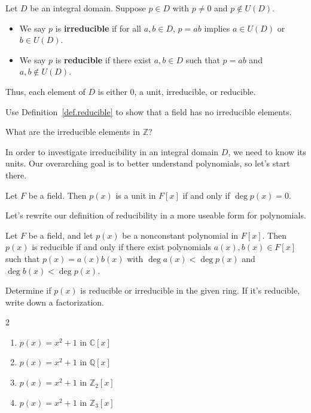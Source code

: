 \begin{definition}\label{def.reducible}
Let $D$ be an integral domain. Suppose $p\in D$ with $p\neq 0$ and $p\notin U(D)$. 
\begin{itemize}
\item We say $p$ is \textbf{irreducible} if for all $a,b\in D$, $p = ab$ implies $a\in U(D)$ or $b\in U(D)$.
\item We say $p$ is \textbf{reducible} if there exist $a,b\in D$ such that $p = ab$ and $a,b\notin U(D)$.
\end{itemize} 
Thus, each element of $D$ is either $0$, a unit, irreducible, or reducible.
\end{definition}

\begin{problem}
Use Definition~\ref{def.reducible} to show that a field has no irreducible elements.
\end{problem}

\begin{problem}
What are the irreducible elements in $\mathbb{Z}$?
\end{problem}

In order to investigate irreducibility in an integral domain $D$, we need to know its units. Our overarching goal is to better understand polynomials, so let's 
start there. 

\begin{theorem}\label{thm.UnitsFAdjoinx}
Let $F$ be a field. Then $p(x)$ is a unit in $F[x]$ if and only if $\deg p(x) = 0$. 
\end{theorem}

Let's  rewrite our definition of reducibility in a more useable form for polynomials.
\begin{theorem}\label{thm.ReduciblePolynomials}
Let $F$ be a field, and let $p(x)$ be a nonconstant polynomial in $F[x]$. Then $p(x)$ is reducible if and only if  there exist polynomials $a(x),b(x) \in F[x]$ such that $p(x) = a(x)b(x)$ with $\deg a(x) <\deg p(x)$ and $\deg b(x) <\deg p(x)$.
\end{theorem}

\begin{problem}
Determine if $p(x)$ is reducible or irreducible in the given ring. If it's reducible, write down a factorization.
\begin{multicols}{2}
\begin{enumerate}
\item $p(x) = x^2+1$ in $\mathbb{C}[x]$
\item $p(x) = x^2+1$ in $\mathbb{Q}[x]$
\item $p(x) = x^2+1$ in $\mathbb{Z}_2[x]$
\item $p(x) = x^2+1$ in $\mathbb{Z}_3[x]$
\end{enumerate}
\end{multicols}
\end{problem}

